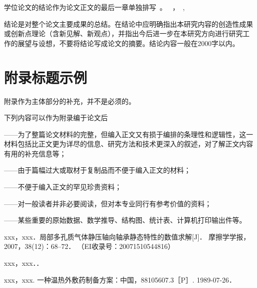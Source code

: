 \documentclass[a4paper, twoside, openany]{NCEPUMaster_Original}
\begin{document}
学位论文的结论作为论文正文的最后一章单独排写~。
~，~, ~

结论是对整个论文主要成果的总结。在结论中应明确指出本研究内容的创造性成果或创新点理论（含新见解、新观点），并指出今后进一步在本研究方向进行研究工作的展望与设想，不要将结论写成论文的摘要。结论内容一般在2000字以内。




  \appendix\chapter{附录标题示例}

附录作为主体部分的补充，并不是必须的。

下列内容可以作为附录编于论文后

——为了整篇论文材料的完整，但编入正文又有损于编排的条理性和逻辑性，这一材料包括比正文更为详尽的信息、研究方法和技术更深入的叙述，对了解正文内容有用的补充信息等；

——由于篇幅过大或取材于复制品而不便于编入正文的材料；

——不便于编入正文的罕见珍贵资料；

——对一般读者并非必要阅读，但对本专业同行有参考价值的资料；

——某些重要的原始数据、数学推导、结构图、统计表、计算机打印输出件等。  \stopappendix
{}


\begin{achievementlist}
\item[ {[1]} ]
xxx，xxx．局部多孔质气体静压轴向轴承静态特性的数值求解[J]．
摩擦学学报，2007，38(12)：68--72．
（EI收录号：20071510544816）
\item[ {[2]} ]
xxx，xxx．．
\end{achievementlist}


\begin{achievementlist}
\item[ {[1]} ]
xxx，xxx. 一种温热外敷药制备方案：中国，88105607.3［P］. 1989-07-26．
\end{achievementlist}
\end{document}

